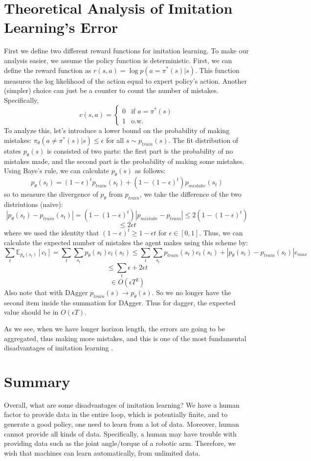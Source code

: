 \section{Theoretical Analysis of Imitation Learning's Error}
First we define two different reward functions for imitation learning. To make our analysis easier, we assume the policy function is deterministic. First, we can define the reward function as $r(s,a)=\log p(a=\pi^*(s)|s)$. This function measures the log likelihood of the action equal to expert policy's action. Another (simpler) choice can just be a counter to count the number of mistakes. Specifically, 
\[ c(s,a) = \begin{cases} 
          0 & \text{if } a = \pi^*(s) \\
          1 & \text{o.w.}
       \end{cases}
    \]
To analyze this, let's introduce a lower bound on the probability of making mistakes: $\pi_\theta(a\neq \pi^*(s)|s)\leq \epsilon$ for all $s\sim p_{train}(s)$. The fit distribution of states $p_\theta(s)$ is consisted of two parts: the first part is the probability of no mistakes made, and the second part is the probability of making some mistakes. Using Baye's rule, we can calculate $p_\theta(s)$ as follows:
$$p_\theta(s_t) = (1-\epsilon)^tp_{train}(s_t)+(1-(1-\epsilon)^t)p_{mistake}(s_t)$$
so to measure the divergence of $p_\theta$ from $p_{train}$, we take the difference of the two distriutions (naive):
$$|p_\theta(s_t)-p_{train}(s_t)|=(1-(1-\epsilon)^t)|p_{mistake}-p_{train}|\leq2(1-(1-\epsilon)^t)$$
$$\leq 2\epsilon t$$
where we used the identity that $(1-\epsilon)^t\geq1-\epsilon t$ for $\epsilon\in [0,1]$. Thus, we can calculate the expected number of mistakes the agent makes using this scheme by:
$$\sum_t\mathbb{E}_{p_\theta(s_t)}[c_t] = \sum_t\sum_{s_t}p_\theta(s_t)c_t(s_t)\leq\sum_t\sum_{s_t}p_{train}(s_t)c_t(s_t)+|p_\theta(s_t)-p_{train}(s_t)|c_{max}$$
$$\leq\sum_t\epsilon+2\epsilon t$$
$$\in O(\epsilon T^2)$$
Also note that with DAgger $p_{train}(s)\rightarrow p_\theta(s)$. So we no longer have the second item inside the summation for DAgger. Thus for dagger, the expected value should be in $O(\epsilon T)$.

As we see, when we have longer horizon length, the errors are going to be aggregated, thus making more mistakes, and this is one of the most fundamental disadvantages of imitation learning \cite{ross2011reduction}.
\section{Summary}
Overall, what are some disadvantages of imitation learning? We have a human factor to provide data in the entire loop, which is potentially finite, and to generate a good policy, one need to learn from a lot of data. Moreover, human cannot provide all kinds of data. Specifically, a human may have trouble with providing data such as the joint angle/torque of a robotic arm. Therefore, we wish that machines can learn automatically, from unlimited data.